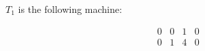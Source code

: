 $T_1$ is the following machine:

$$\begin{array}{cccc}
0 & 0 & 1 & 0 \\
0 & 1 & 4 & 0
\end{array}$$
